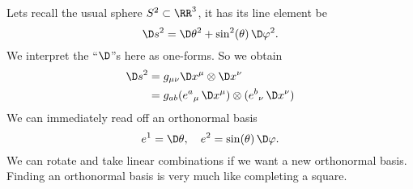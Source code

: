 \begin{ex}[2-Sphere]
Lets recall the usual sphere $S^{2}\subset\RR^{3}$, it has its
line element be
\begin{equation}
\D s^{2}=\D\theta^{2}+\sin^{2}(\theta)\,\D\varphi^{2}.
\end{equation}
We interpret the ``$\D$''s here as one-forms. So we obtain
\begin{equation}
\begin{split}
\D s^{2}
&=g_{\mu\nu}\D x^{\mu}\otimes\D x^{\nu}\\
&=g_{ab}({e^{a}}_{\mu}\,\D x^{\mu})\otimes({e^{b}}_{\nu}\,\D x^{\nu})
\end{split}
\end{equation}
We can immediately read off an orthonormal basis
\begin{equation}
e^{1}=\D\theta,\quad
e^{2}=\sin(\theta)\,\D\varphi.
\end{equation}
We can rotate and take linear combinations if we want a new
orthonormal basis. Finding an orthonormal basis is very much like
completing a square.


\end{ex}
